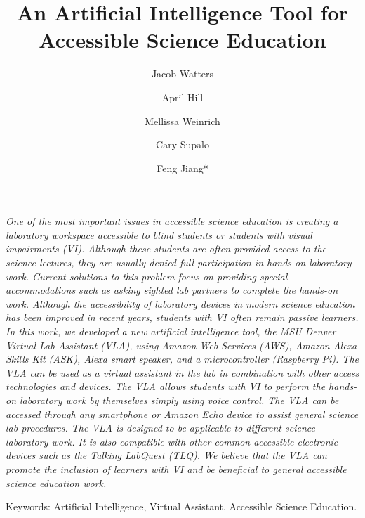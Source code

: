 \documentclass[11.5pt]{sig-alternate} %
\makeatletter
\let\oldabstract\abstract
\let\oldendabstract\endabstract
\renewenvironment{abstract} %
{\renewenvironment{quotation}%
               {\list{}{\addtolength{\leftmargin}{1em} %
                        \listparindent 1.5em%
                        \itemindent    \listparindent%
                        \rightmargin   \leftmargin%
                        \parsep        \z@ \@plus\p@}%
                \item\relax}%
               {\endlist}%
\oldabstract}
{\oldendabstract}
\makeatother
\begin{document}
\title{An Artificial Intelligence Tool for Accessible Science Education}

\author[1]{\large \color{blue}Jacob Watters}
\author[1]{\large \color{blue}April Hill}
\author[2]{\large \color{blue}Mellissa Weinrich}
\author[3]{\large \color{blue}Cary Supalo}
\author[1]{\large \color{blue}Feng Jiang*}

\toappear{}
\maketitle
\begin{@twocolumnfalse} 
\begin{abstract}
\item 
\begin{large}
\textit{One of the most important issues in accessible science education is creating a laboratory workspace accessible to blind students or students with visual impairments (VI). Although these students are often provided access to the science lectures, they are usually denied full participation in hands-on laboratory work. Current solutions to this problem focus on providing special accommodations such as asking sighted lab partners to complete the hands-on work. Although the accessibility of laboratory devices in modern science education has been improved in recent years, students with VI often remain passive learners. In this work, we developed a new artificial intelligence tool, the MSU Denver Virtual Lab Assistant (VLA), using Amazon Web Services (AWS), Amazon Alexa Skills Kit (ASK), Alexa smart speaker, and a microcontroller (Raspberry Pi). The VLA can be used as a virtual assistant in the lab in combination with other access technologies and devices. The VLA allows students with VI to perform the hands-on laboratory work by themselves simply using voice control. The VLA can be accessed through any smartphone or Amazon Echo device to assist general science lab procedures. The VLA is designed to be applicable to different science laboratory work. It is also compatible with other common accessible electronic devices such as the Talking LabQuest (TLQ). We believe that the VLA can promote the inclusion of learners with VI and be beneficial to general accessible science education work.}

\item Keywords: Artificial Intelligence, Virtual Assistant, Accessible Science Education.
\end{large}
\end{abstract}
\end{@twocolumnfalse}
\end{document}
